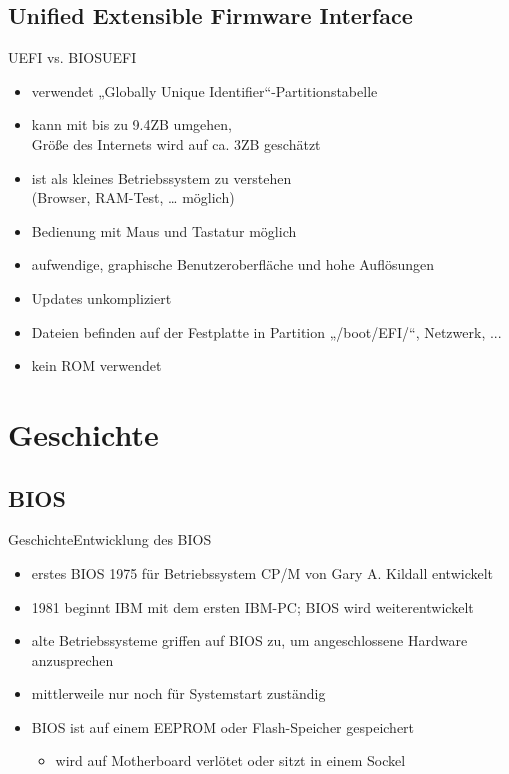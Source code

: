 \documentclass[9pt]{beamer}
\begin{document}
    \subsection{Unified Extensible Firmware Interface}
        \begin{frame}{UEFI vs. BIOS}{UEFI}
            \begin{itemize}
                \item verwendet „Globally Unique Identifier“-Partitionstabelle
                \item kann mit bis zu 9.4ZB umgehen,\\Größe des Internets wird auf ca. 3ZB geschätzt
                \item ist als kleines Betriebssystem zu verstehen\\(Browser, RAM-Test, … möglich)
                \item Bedienung mit Maus und Tastatur möglich
                \item aufwendige, graphische Benutzeroberfläche und hohe Auflösungen
                \item Updates unkompliziert
                \item Dateien befinden auf der Festplatte in Partition „/boot/EFI/“, Netzwerk, ...
                \item kein ROM verwendet
            \end{itemize}
        \end{frame}

    \section{Geschichte}
        \subsection{BIOS}
            \begin{frame}{Geschichte}{Entwicklung des BIOS}
                \begin{itemize}
                    \item erstes BIOS 1975 für Betriebssystem CP/M von Gary A. Kildall entwickelt
                	\item 1981 beginnt IBM mit dem ersten IBM-PC; BIOS wird weiterentwickelt
                	\item alte Betriebssysteme griffen auf BIOS zu, um angeschlossene Hardware anzusprechen
                	\item mittlerweile nur noch für Systemstart zuständig
                	\item BIOS ist auf einem EEPROM oder Flash-Speicher gespeichert
                	\begin{itemize}
                		\item wird auf Motherboard verlötet oder sitzt in einem Sockel
                	\end{itemize}
                \end{itemize}
            \end{frame}
\end{document}
